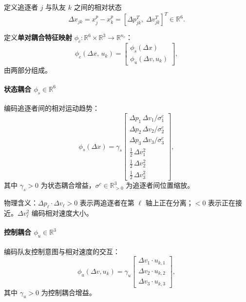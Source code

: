 \documentclass[12pt,a4paper]{ctexart}
\begin{document}
定义追逐者 $j$ 与队友 $k$ 之间的相对状态
\[
\Delta x_{jk} = x_j^p - x_k^p = [\Delta p_{jk}^T,\; \Delta v_{jk}^T]^T \in \mathbb{R}^6.
\]

定义\textbf{单对耦合特征映射} $\phi_c\colon \mathbb{R}^6 \times \mathbb{R}^3 \to \mathbb{R}^{n_c}$：
\begin{equation}\label{eq:phi-c}
\phi_c(\Delta x,\, u_k) = \begin{bmatrix} \phi_s(\Delta x) \\ \phi_u(\Delta v, u_k) \end{bmatrix},
\end{equation}
由两部分组成。

\paragraph{状态耦合 $\phi_s \in \mathbb{R}^6$}
编码追逐者间的相对运动趋势：
\begin{equation}\label{eq:phi-s}
\phi_s(\Delta x) = \gamma_s \begin{bmatrix}
\Delta p_1\,\Delta v_1 / \sigma_1^c \\
\Delta p_2\,\Delta v_2 / \sigma_2^c \\
\Delta p_3\,\Delta v_3 / \sigma_3^c \\
\tfrac{1}{2}\,\Delta v_1^2 \\
\tfrac{1}{2}\,\Delta v_2^2 \\
\tfrac{1}{2}\,\Delta v_3^2
\end{bmatrix},
\end{equation}
其中 $\gamma_s > 0$ 为状态耦合增益，$\sigma^c \in \mathbb{R}^3_{>0}$ 为追逐者间位置缩放。

物理含义：$\Delta p_\ell \cdot \Delta v_\ell > 0$ 表示两追逐者在第 $\ell$ 轴上正在分离；$< 0$ 表示正在接近。$\Delta v_\ell^2$ 编码相对速度大小。

\paragraph{控制耦合 $\phi_u \in \mathbb{R}^3$}
编码队友控制意图与相对速度的交互：
\begin{equation}\label{eq:phi-u}
\phi_u(\Delta v, u_k) = \gamma_u \begin{bmatrix}
\Delta v_1 \cdot u_{k,1} \\
\Delta v_2 \cdot u_{k,2} \\
\Delta v_3 \cdot u_{k,3}
\end{bmatrix},
\end{equation}
其中 $\gamma_u > 0$ 为控制耦合增益。
\end{document}
